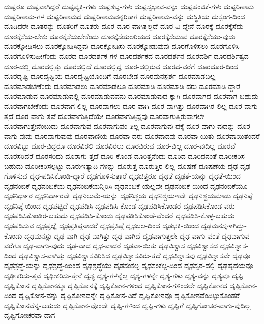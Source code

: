 {ದುಷ್ಟರೂ
ದುಷ್ಟವಾಗಿದ್ದರೆ
ದುಷ್ಟವ್ಯಕ್ತಿ-ಗಳು
ದುಷ್ಟಶಬ್ದ-ಗಳು
ದುಷ್ಟಸ್ವಭಾವ-ವನ್ನು
ದುಷ್ಟಹಂಚಿಕೆ-ಗಳು
ದುಷ್ಪರಿಣಾಮ
ದುಷ್ಪರಿಣಾಮ-ಗಳ
ದುಷ್ಪರಿಣಾಮದ
ದುಷ್ಪರಿಣಾಮವನ್ನರಿತಾಗ
ದುಷ್ಪರಿಣಾಮ-ವನ್ನು
ದುಸ್ಥಿತಿಯ
ದುಸ್ಸಂಗ-ದಿಂದ
ದೂಡಿದರೇ
ದೂತರನ್ನು
ದೂತರಿಗೆ
ದೂತರು
ದೂರ
ದೂರ-ವಾಗಿತ್ತಲ್ಲದೆ
ದೂರ-ವಿ-ದ್ದೇನೆ
ದೂರಕ್ಕೆ
ದೂರಕ್ಕೆಸೆದು
ದೂರಕ್ಕೆಸೆಯ-ಬೇಕು
ದೂರಕ್ಕೆಸೆಯಬೇಕೆಂದು
ದೂರಕ್ಕೆಸೆಯಲರಿಯದ
ದೂರಕ್ಕೆಸೆಯುವ
ದೂರಕ್ಕೆಸೆಯು-ವುದು
ದೂರಕ್ಕೋಡಿಸಲು
ದೂರಕ್ಕೋಡಿಸಿದ್ದವು
ದೂರಕ್ಕೋಡಿಸು
ದೂರಕ್ಕೋಡುವುವು
ದೂರಗೊಳಿಸಲು
ದೂರಗೊಳಿಸಿ
ದೂರಗೊಳಿಸುಹೀಗೆಂದು
ದೂರದ
ದೂರದರ್ಶಕ-ಗಳ
ದೂರದರ್ಶಕದ
ದೂರದರ್ಶನ
ದೂರದರ್ಶಿ
ದೂರದರ್ಶಿತ್ವದ
ದೂರ-ದಲ್ಲಿ
ದೂರದಲ್ಲಿತ್ತು
ದೂರದಲ್ಲಿದೆ
ದೂರದಲ್ಲಿದ್ದ
ದೂರ-ದಲ್ಲಿರುವ
ದೂರದ-ವರೆಗೆ
ದೂರದೂರ-ದಿಂದ
ದೂರದೃಷ್ಟಿ
ದೂರದೃಷ್ಟಿಯ
ದೂರದೃಷ್ಟಿಯೊಂದಿಗೆ
ದೂರಬೇಡ
ದೂರಮನಸ್ಪರ್ಶ
ದೂರಮಾಡಬಲ್ಲ
ದೂರಮಾಡಬೇಕೆಂದು
ದೂರಮಾಡಲು
ದೂರಮಾಡಲೂ
ದೂರಮಾಡಿ
ದೂರಮಾಡಿ-ದರು
ದೂರಮಾಡಿ-ದ್ದಾರೆ
ದೂರಮಾಡುವ
ದೂರಮಾಡುವಲ್ಲಿ
ದೂರಮಾಡುವವನು
ದೂರಮಾಡುವುದ-ಕ್ಕಾಗಿ
ದೂರವಾಗದ
ದೂರವಾಗ-ಬಹುದು
ದೂರವಾಗಬೇಕೆಂದು
ದೂರವಾಗ-ಲಿಲ್ಲ
ದೂರವಾಗಲು
ದೂರ-ವಾಗಿ
ದೂರ-ವಾಗಿತ್ತು
ದೂರವಾಗಿರ-ಲಿಲ್ಲ
ದೂರ-ವಾಗು-ತ್ತದೆ
ದೂರ-ವಾಗು-ತ್ತವೆ
ದೂರವಾಗುತ್ತಿದೆಯೇ
ದೂರವಾಗುತ್ತಿದ್ದವು
ದೂರವಾಗುತ್ತಿರುವಾಗಲೇ
ದೂರವಾಗುತ್ತೇನೆಂಬುದು
ದೂರವಾಗುವ
ದೂರವಾಗುವಂ-ತಿಲ್ಲ
ದೂರವಾಗುವು-ದಕ್ಕೆ
ದೂರ-ವಾಗು-ವುದನ್ನು
ದೂರ-ವಾಗು-ವುದು
ದೂರವಾಗುವುವು
ದೂರವಾಣಿಯ
ದೂರವಾ-ದರು
ದೂರವಾದವು
ದೂರವಾ-ಯಿತು
ದೂರವಾಯಿತೆಂದರೆ
ದೂರವಿಟ್ಟು
ದೂರ-ವಿದ್ದರೂ
ದೂರವಿರಲಿ
ದೂರವಿರಲು
ದೂರವಿರುವ
ದೂರ-ವಿಲ್ಲ
ದೂರ-ವುದಿಲ್ಲ
ದೂರವೆ
ದೂರಸರಿದರೆ
ದೂರಸರಿದು
ದೂರಾಗು-ತ್ತದೆ
ದೂರಿ-ಕೊಂಡ
ದೂರಿತ್ತನೆಂದು
ದೂರಿದ
ದೂರಿದನಂತೆ
ದೂರೀಕರಿಸ-ಬಹುದು
ದೂರೀಕರಿಸಲ್ಪಟ್ಟು
ದೂರುಇತ್ಯಾದಿ-ಗಳನ್ನು
ದೂರುತ್ತ
ದೂರುತ್ತಿರ-ಲಿಲ್ಲ
ದೂಷಣೆ
ದೂಷಣೆಯ
ದೃಢ
ದೃಢ-ಗೊಳಿಸುವ
ದೃಢ-ಪಡಿಸಿಕೊಂಡಿ-ದ್ದಾರೆ
ದೃಢಗೊಳಿಸುತ್ತಾರೆ
ದೃಢಚಿತ್ತರೂ
ದೃಢತೆ
ದೃಢತೆ-ಯನ್ನು
ದೃಢತೆ-ಯಿಂದ
ದೃಢನಂಬಿಕೆ
ದೃಢನಂಬಿಕೆಯ
ದೃಢನಂಬಿಕೆಯನ್ನಿರಿಸಿ
ದೃಢನಂಬಿಕೆ-ಯಲ್ಲವೇ
ದೃಢನಂಬಿಕೆ-ಯಿಂದ
ದೃಢನಂಬಿಕೆಯೂ
ದೃಢನಿರ್ಧಾರ
ದೃಢನಿರ್ಧಾರವೇ
ದೃಢನಿಲುಮೆ-ಯನ್ನು
ದೃಢನಿಶ್ಚಯ
ದೃಢನಿಶ್ಚಯಇವೇ
ದೃಢನಿಶ್ಚಯಮಾಡು
ದೃಢನಿಷ್ಠೆ
ದೃಢನಿಷ್ಠೆ-ಯಿಂದ
ದೃಢಪಟ್ಟಿದೆ
ದೃಢಪಡಿಸಿ
ದೃಢಪಡಿಸಿ-ಕೊಂಡ
ದೃಢಪಡಿಸಿಕೊಂಡರೆ
ದೃಢಪಡಿಸಿಕೊಂಡ-ವರು
ದೃಢಪಡಿಸಿಕೊಂಡಿರ-ಬಹುದು
ದೃಢಪಡಿಸಿ-ಕೊಂಡು
ದೃಢಪಡಿಸಿಕೊಂಡೆ-ವೆಂದರೆ
ದೃಢಪಡಿಸಿ-ಕೊಳ್ಳ-ಬಹುದು
ದೃಢಪಡಿಸುವ
ದೃಢಪ್ರಜ್ಞೆ
ದೃಢಪ್ರತಿಷ್ಠನಾದರೆ
ದೃಢಪ್ರತಿಷ್ಠೆ
ದೃಢಬಲ-ದಿಂದ
ದೃಢಭಕ್ತಿ-ಯಿಂದ
ದೃಢಮನಸ್ಕಳಾಗಿದ್ದು-ಕೊಂಡು
ದೃಢಮನಸ್ಸು
ದೃಢ-ವಾಗಿ
ದೃಢ-ವಾಗಿತ್ತು
ದೃಢ-ವಾಗಿದೆ
ದೃಢವಾಗುತ್ತಲೇ
ದೃಢ-ವಾಗು-ವಂತೆ
ದೃಢವಾಗುವ-ವರೆಗೂ
ದೃಢ-ವಾಗು-ವುದು
ದೃಢ-ವಾದ
ದೃಢ-ವಾದರೆ
ದೃಢವಾ-ಯಿತು
ದೃಢವಿಶ್ವಾಸ
ದೃಢವಿಶ್ವಾಸದ
ದೃಢವಿಶ್ವಾಸ-ದಿಂದ
ದೃಢವಿಶ್ವಾಸ-ವಾಗಿತ್ತು
ದೃಢವಿಶ್ವಾಸವಿರಿಸಿದ
ದೃಢವಿಶ್ವಾಸವಿರು-ತ್ತದೆ
ದೃಢವಿಶ್ವಾಸವು
ದೃಢವಿಶ್ವಾಸವೇ
ದೃಢವೂ
ದೃಢಶ್ರದ್ಧೆ-ಯನ್ನು
ದೃಢಶ್ರದ್ಧೆ-ಯಿಂದ
ದೃಢಶ್ರದ್ಧೆಯು
ದೃಢಸಂಕಲ್ಪ
ದೃಢಸಂಕಲ್ಪ-ದಿಂದ
ದೃಢಸ್ವರ-ದಲ್ಲಿ
ದೃಢಹೃದಯವೂ
ದೃಢೀಕರಿಸು-ತ್ತವೆ
ದೃಢೀಕರಿಸು-ತ್ತೇನೆ
ದೃಶ್ಯ
ದೃಶ್ಯ-ಗಳನ್ನೆಲ್ಲ
ದೃಶ್ಯ-ಗಳನ್ನೇ
ದೃಶ್ಯ-ಗಳು
ದೃಶ್ಯ-ವನ್ನು
ದೃಶ್ಯವೂ
ದೃಷ್ಟಿ
ದೃಷ್ಟಿಕೋನ
ದೃಷ್ಟಿಕೋನಕ್ಕೂ
ದೃಷ್ಟಿಕೋನಕ್ಕೆ
ದೃಷ್ಟಿಕೋನ-ಗಳಿಂದ
ದೃಷ್ಟಿಕೋನ-ಗಳಿಂದಲೇ
ದೃಷ್ಟಿಕೋನದ
ದೃಷ್ಟಿಕೋನ-ದಿಂದ
ದೃಷ್ಟಿಕೋನ-ವನ್ನು
ದೃಷ್ಟಿಕೋನವನ್ನೇ
ದೃಷ್ಟಿಕೋನ-ವಿದೆ
ದೃಷ್ಟಿಕೋನವೂ
ದೃಷ್ಟಿಕೋನವೆಂದಿಟ್ಟುಕೊಂಡರೆ
ದೃಷ್ಟಿಕೋನವೆನ್ನ-ಬಹುದು
ದೃಷ್ಟಿಕೋನ-ವೊಂದೇ
ದೃಷ್ಟಿ-ಗಳಿಂದ
ದೃಷ್ಟಿ-ಗಳು
ದೃಷ್ಟಿಗೆ
ದೃಷ್ಟಿಗೋಚರ-ವಾಗು-ವುದಿಲ್ಲ
ದೃಷ್ಟಿಗೋಚರವಾ-ದಾಗ
}
